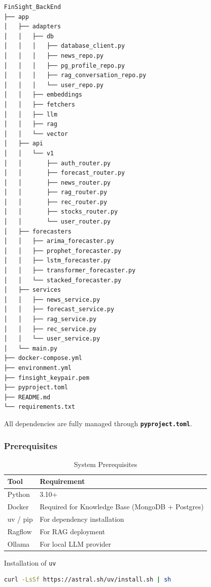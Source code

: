 \begin{lstlisting}[language={}, basicstyle=\ttfamily\small]
FinSight_BackEnd
├── app
│   ├── adapters
│   │   ├── db
│   │   │   ├── database_client.py
│   │   │   ├── news_repo.py
│   │   │   ├── pg_profile_repo.py
│   │   │   ├── rag_conversation_repo.py
│   │   │   └── user_repo.py
│   │   ├── embeddings
│   │   ├── fetchers
│   │   ├── llm
│   │   ├── rag
│   │   └── vector
│   ├── api
│   │   └── v1
│   │       ├── auth_router.py
│   │       ├── forecast_router.py
│   │       ├── news_router.py
│   │       ├── rag_router.py
│   │       ├── rec_router.py
│   │       ├── stocks_router.py
│   │       └── user_router.py
│   ├── forecasters
│   │   ├── arima_forecaster.py
│   │   ├── prophet_forecaster.py
│   │   ├── lstm_forecaster.py
│   │   ├── transformer_forecaster.py
│   │   └── stacked_forecaster.py
│   ├── services
│   │   ├── news_service.py
│   │   ├── forecast_service.py
│   │   ├── rag_service.py
│   │   ├── rec_service.py
│   │   └── user_service.py
│   └── main.py
├── docker-compose.yml
├── environment.yml
├── finsight_keypair.pem
├── pyproject.toml
├── README.md
└── requirements.txt
\end{lstlisting}

All dependencies are fully managed through \textbf{\texttt{pyproject.toml}}.

\subsubsection{Prerequisites}

\begin{table}[H]
\centering
\caption{System Prerequisites}
\begin{tabular}{|l|l|}
\hline
\textbf{Tool} & \textbf{Requirement} \\
\hline
Python & 3.10+ \\
Docker & Required for Knowledge Base (MongoDB + Postgres) \\
uv / pip & For dependency installation \\
Ragflow & For RAG deployment \\
Ollama & For local LLM provider \\
\hline
\end{tabular}
\end{table}

Installation of \texttt{uv}
\begin{lstlisting}[language=bash]
curl -LsSf https://astral.sh/uv/install.sh | sh
\end{lstlisting}

